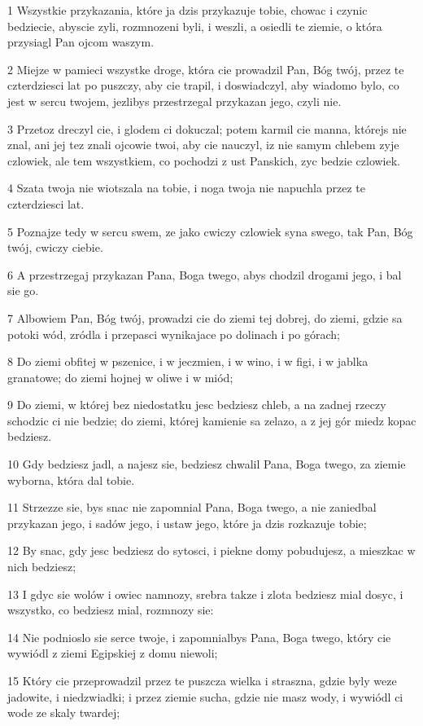 \par 1 Wszystkie przykazania, które ja dzis przykazuje tobie, chowac i czynic bedziecie, abyscie zyli, rozmnozeni byli, i weszli, a osiedli te ziemie, o która przysiagl Pan ojcom waszym.
\par 2 Miejze w pamieci wszystke droge, która cie prowadzil Pan, Bóg twój, przez te czterdziesci lat po puszczy, aby cie trapil, i doswiadczyl, aby wiadomo bylo, co jest w sercu twojem, jezlibys przestrzegal przykazan jego, czyli nie.
\par 3 Przetoz dreczyl cie, i glodem ci dokuczal; potem karmil cie manna, którejs nie znal, ani jej tez znali ojcowie twoi, aby cie nauczyl, iz nie samym chlebem zyje czlowiek, ale tem wszystkiem, co pochodzi z ust Panskich, zyc bedzie czlowiek.
\par 4 Szata twoja nie wiotszala na tobie, i noga twoja nie napuchla przez te czterdziesci lat.
\par 5 Poznajze tedy w sercu swem, ze jako cwiczy czlowiek syna swego, tak Pan, Bóg twój, cwiczy ciebie.
\par 6 A przestrzegaj przykazan Pana, Boga twego, abys chodzil drogami jego, i bal sie go.
\par 7 Albowiem Pan, Bóg twój, prowadzi cie do ziemi tej dobrej, do ziemi, gdzie sa potoki wód, zródla i przepasci wynikajace po dolinach i po górach;
\par 8 Do ziemi obfitej w pszenice, i w jeczmien, i w wino, i w figi, i w jablka granatowe; do ziemi hojnej w oliwe i w miód;
\par 9 Do ziemi, w której bez niedostatku jesc bedziesz chleb, a na zadnej rzeczy schodzic ci nie bedzie; do ziemi, której kamienie sa zelazo, a z jej gór miedz kopac bedziesz.
\par 10 Gdy bedziesz jadl, a najesz sie, bedziesz chwalil Pana, Boga twego, za ziemie wyborna, która dal tobie.
\par 11 Strzezze sie, bys snac nie zapomnial Pana, Boga twego, a nie zaniedbal przykazan jego, i sadów jego, i ustaw jego, które ja dzis rozkazuje tobie;
\par 12 By snac, gdy jesc bedziesz do sytosci, i piekne domy pobudujesz, a mieszkac w nich bedziesz;
\par 13 I gdyc sie wolów i owiec namnozy, srebra takze i zlota bedziesz mial dosyc, i wszystko, co bedziesz mial, rozmnozy sie:
\par 14 Nie podnioslo sie serce twoje, i zapomnialbys Pana, Boga twego, który cie wywiódl z ziemi Egipskiej z domu niewoli;
\par 15 Który cie przeprowadzil przez te puszcza wielka i straszna, gdzie byly weze jadowite, i niedzwiadki; i przez ziemie sucha, gdzie nie masz wody, i wywiódl ci wode ze skaly twardej;
